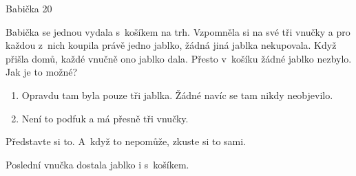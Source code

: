 Babička
20 %

Babička se jednou vydala s~košíkem na trh. Vzpomněla si na své tři vnučky a pro
každou z~nich koupila právě jedno jablko, žádná jiná jablka nekupovala. Když přišla 
domů, každé vnučně ono jablko dala. Přesto v~košíku žádné jablko nezbylo. Jak
je to možné? 

\begin{enumerate}
\item Opravdu tam byla pouze tři jablka. Žádné navíc se tam nikdy neobjevilo.
\item Není to podfuk a má přesně tři vnučky.
\end{enumerate}

Představte si to. A~když to nepomůže, zkuste si to sami.

Poslední vnučka dostala jablko i s~košíkem.

